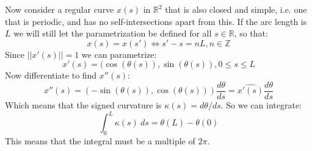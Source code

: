 \documentclass[12pt, a4paper]{article}
\numberwithin{equation}{section}
\begin{document}
Now consider a regular curve $x(s)$ in $\mathbb{R}^2$ that is also closed and simple, i.e. one that is periodic, and has no self-intersections apart from this. If the arc length is $L$ we will still let the parametrization be defined for all $s\in\mathbb{R}$, so that:
\begin{equation}
x(s)=x(s')\Leftrightarrow s'-s=nL, n\in\mathbb{Z}
\end{equation}
Since $||x'(s)||=1$ we can parametrize:
\begin{equation}
x'(s)=(\cos(\theta(s)),\sin(\theta(s)), 0\le s\le L
\end{equation}
Now differentiate to find $x''(s)$:
\begin{equation}
x''(s)=(-\sin(\theta(s)),\cos(\theta(s)))\frac{d\theta}{ds}=\widehat{x'(s)}\frac{d\theta}{ds}
\end{equation}
Which means that the signed curvature is $\kappa(s)=d\theta/ds$. So we can integrate:
\begin{equation}
\int_0^L\kappa(s)\ ds=\theta(L)-\theta(0)
\label{2d_curvature_integral}
\end{equation}
This means that the integral must be a multiple of $2\pi$.
\end{document}
